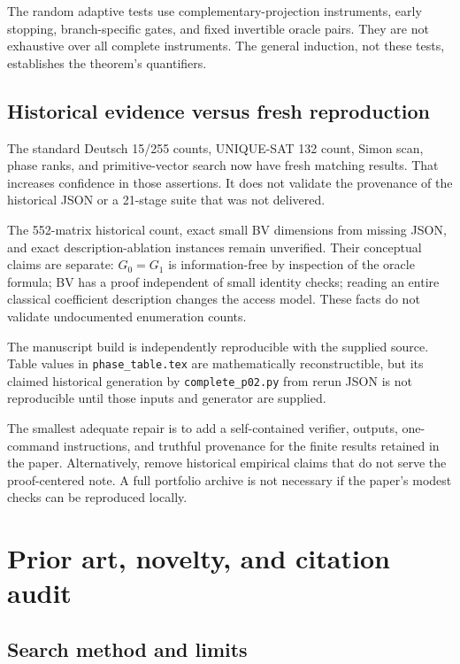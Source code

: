 \documentclass[
  11pt,
]{article}
\begin{document}
The random adaptive tests use complementary-projection instruments,
early stopping, branch-specific gates, and fixed invertible oracle
pairs. They are not exhaustive over all complete instruments. The
general induction, not these tests, establishes the theorem's
quantifiers.

\subsection{Historical evidence versus fresh
reproduction}\label{historical-evidence-versus-fresh-reproduction}

The standard Deutsch 15/255 counts, UNIQUE-SAT 132 count, Simon scan,
phase ranks, and primitive-vector search now have fresh matching
results. That increases confidence in those assertions. It does not
validate the provenance of the historical JSON or a 21-stage suite that
was not delivered.

The 552-matrix historical count, exact small BV dimensions from missing
JSON, and exact description-ablation instances remain unverified. Their
conceptual claims are separate: \(G_0=G_1\) is information-free by
inspection of the oracle formula; BV has a proof independent of small
identity checks; reading an entire classical coefficient description
changes the access model. These facts do not validate undocumented
enumeration counts.

The manuscript build is independently reproducible with the supplied
source. Table values in \nolinkurl{phase_table.tex} are mathematically
reconstructible, but its claimed historical generation by
\nolinkurl{complete_p02.py} from rerun JSON is not reproducible until
those inputs and generator are supplied.

The smallest adequate repair is to add a self-contained verifier,
outputs, one-command instructions, and truthful provenance for the
finite results retained in the paper. Alternatively, remove historical
empirical claims that do not serve the proof-centered note. A full
portfolio archive is not necessary if the paper's modest checks can be
reproduced locally.

\section{Prior art, novelty, and citation
audit}\label{prior-art-novelty-and-citation-audit}

\subsection{Search method and limits}\label{search-method-and-limits}
\end{document}
